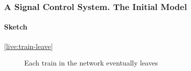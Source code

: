 \begin{frame}
  \frametitle{A Signal Control System. The Initial Model}
  \framesubtitle{Sketch}
  \begin{description}
  \item[\ref{live:train-leave}]{Each \alert{train in the network} eventually leaves}
  \end{description}
  \medskip
\end{frame}





